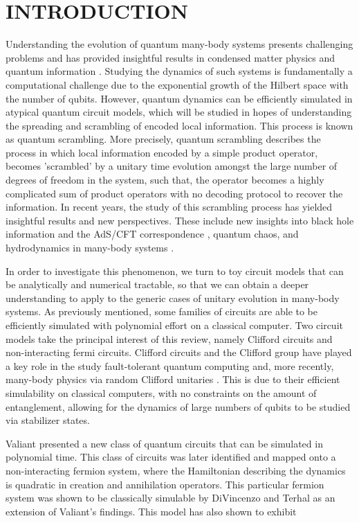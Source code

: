 \section{INTRODUCTION}
Understanding the evolution of quantum many-body systems presents challenging problems and has
provided insightful results in condensed matter physics and quantum information \cite{Polkovnikov_2011}.
Studying the dynamics of such systems is fundamentally
a computational challenge due to the exponential growth of the Hilbert space with the number of
qubits. However, quantum dynamics can be efficiently simulated in atypical quantum circuit models,
which will be studied in hopes of understanding the spreading and scrambling of encoded local information.
This process is known as quantum scrambling. More precisely, quantum scrambling describes the
process in which local information encoded by a simple product operator, becomes 'scrambled' by a
unitary time evolution amongst the large number of degrees of freedom in the system, such that, the
operator becomes a highly complicated sum of product operators with no decoding protocol to recover
the information. In recent years, the study of this scrambling process has yielded insightful
results and new perspectives. These include new insights into black hole information and the
AdS/CFT correspondence \cite{Calabrese_2009,Jerusalem,Jensen_2016,https://doi.org/10.48550/arxiv.1802.01198,Sekino_2008,ShenkerBlackHolesButterfly2014},
quantum chaos, \cite{Maldacena_2016} and hydrodynamics in many-body systems \cite{Khemani_2018, PhysRevX.8.021013, PhysRevX.8.031058,Grozdanov_2018, Blake_2018}.

In order to investigate this phenomenon, we turn to toy circuit models that can be analytically and
numerical tractable, so that we can obtain a deeper understanding to apply to the generic cases of unitary
evolution in many-body systems. As previously mentioned, some families of circuits are able to be efficiently
simulated with polynomial effort on a classical computer. Two circuit models take the principal interest of
this review, namely Clifford circuits and non-interacting fermi circuits. Clifford circuits and the Clifford
group have played a key role in the study fault-tolerant quantum computing and, more recently, many-body physics via
random Clifford unitaries \cite{PhysRevB.98.205136, https://doi.org/10.48550/arxiv.2110.02988}.
This is due to their efficient simulability on classical computers, with no constraints on the amount of entanglement,
allowing for the dynamics of large numbers of qubits to be studied via stabilizer states.

Valiant \cite{Valiant2001QuantumCT} presented a new class of quantum circuits that can be simulated in
polynomial time. This class of circuits was later identified and mapped onto a non-interacting fermion system, where the Hamiltonian
describing the dynamics is quadratic in creation and annihilation operators. This particular fermion
system was shown to be classically simulable by DiVincenzo and Terhal \cite{Terhal2001} as an extension of Valiant's findings.
This model has also shown to exhibit



